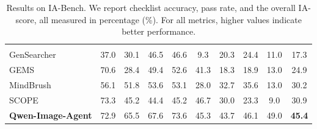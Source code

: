 \begin{table}[t]
{\begin{tabular}{lccccccccc}
\midrule
\rowcolor{gray!8}
\multicolumn{10}{l}{\textit{Agentic Image Generation Models}} \\
GenSearcher~\citep{Feng2026GenSearcherRA}
& 37.0 & 30.1 & 46.5 & 46.6
& 9.3 & 20.3 & 24.4 & 11.0
& 17.3 \\
GEMS~\citep{He2026GEMSAM}
& 70.6 & 28.4 & 49.4 & 52.6
& 41.3 & 18.3 & 18.9 & 13.0
& 24.9 \\
MindBrush~\citep{He2026MindBrushIA}
& 56.1 & 51.8 & 53.6 & 53.1
& 28.0 & 32.7 & 35.6 & 13.0
& 30.2 \\
SCOPE~\citep{Ren2026SCOPESD}
& 73.3 & 45.2 & 44.4 & 45.2
& 46.7 & 30.0 & 23.3 & 9.0
& 30.9 \\
\rowcolor{blue!8}
\textbf{Qwen-Image-Agent}
& 72.9 & 65.5 & 67.6 & 73.6
& 45.3 & 43.7 & 46.1 & 49.0
& {\color{blue!70!black}\textbf{45.4}} \\
\bottomrule
\end{tabular}
}
\caption{Results on IA-Bench. We report checklist accuracy, pass rate, and the overall IA-score, all measured in percentage (\%). For all metrics, higher values indicate better performance.
}
\label{tab:ia_bench}
\end{table}

